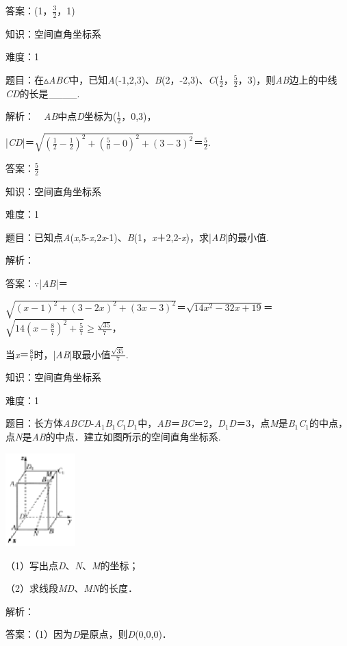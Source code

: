 \documentclass{article} %
\begin{document}
答案：(1，$\frac{3}{2}$，1)

知识：空间直角坐标系

难度：1

题目：在$\mathrm{\vartriangle}$\textit{ABC}中，已知\textit{A}(-1,2,3)、\textit{B}(2，-2,3)、\textit{C}($\frac{1}{2}$，$\frac{5}{2}$，3)，则\textit{AB}边上的中线\textit{CD}的长是\_\_\_\_.

解析：　\textit{AB}中点\textit{D}坐标为($\frac{1}{2}$，0,3)，

|\textit{CD}|＝$\sqrt{(\frac{1}{2}-\frac{1}{2})^2+(\frac{5}{0}-0)^2+(3-3)^2}$＝$\frac{5}{2}$.

答案：$\frac{5}{2}$

知识：空间直角坐标系

难度：1

题目：已知点\textit{A}(\textit{x,}5-\textit{x,}2\textit{x}-1)、\textit{B}(1，\textit{x}＋2,2-\textit{x})，求|\textit{AB}|的最小值.

解析：

答案：$\mathrm{\because}$|\textit{AB}|＝

$\sqrt{(x-1)^2+(3-2x)^2+(3x-3)^2}$＝$\sqrt{14x^2-32x+19}$＝$\sqrt{14(x-\frac{8}{7})^2+\frac{5}{7}}$$\mathrm{\ge}$$\frac{\sqrt{35}}{7}$，

当\textit{x}＝$\frac{8}{7}$时，|\textit{AB}|取最小值$\frac{\sqrt{35}}{7}$.

知识：空间直角坐标系

难度：1

题目：长方体\textit{ABCD}-\textit{A}${}_{1}$\textit{B}${}_{1}$\textit{C}${}_{1}$\textit{D}${}_{1}$中，\textit{AB}＝\textit{BC}＝2，\textit{D}${}_{1}$\textit{D}＝3，点\textit{M}是\textit{B}${}_{1}$\textit{C}${}_{1}$的中点，点\textit{N}是\textit{AB}的中点．建立如图所示的空间直角坐标系.

\includegraphics*[width=1.06in, height=1.41in, keepaspectratio=false]{image310}

（1）写出点\textit{D}、\textit{N}、\textit{M}的坐标；

（2）求线段\textit{MD}、\textit{MN}的长度．

解析：

答案：（1）因为\textit{D}是原点，则\textit{D}(0,0,0)．
\end{document}
